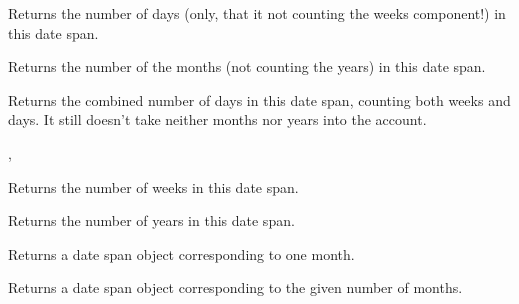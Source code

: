 Returns the number of days (only, that it not counting the weeks component!)
in this date span.





Returns the number of the months (not counting the years) in this date span.



Returns the combined number of days in this date span, counting both weeks and
days. It still doesn't take neither months nor years into the account.


, 



Returns the number of weeks in this date span.





Returns the number of years in this date span.



Returns a date span object corresponding to one month.





Returns a date span object corresponding to the given number of months.

